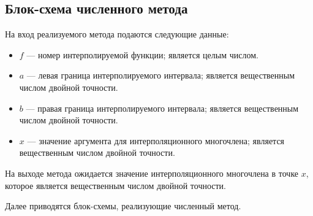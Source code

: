 \subsection{Блок-схема численного метода}

На вход реализуемого метода подаются следующие данные:

\begin{itemize}
  \item \( f \) --- номер интерполируемой функции; является целым числом.
  \item \( a \) --- левая граница интерполируемого интервала; является вещественным числом двойной точности.
  \item \( b \) --- правая граница интерполируемого интервала; является вещественным числом двойной точности.
  \item \( x \) --- значение аргумента для интерполяционного многочлена; является вещественным числом двойной точности.
\end{itemize}

На выходе метода ожидается значение интерполяционного многочлена в точке \( x \), которое является вещественным числом двойной точности.

Далее приводятся блок-схемы, реализующие численный метод.

